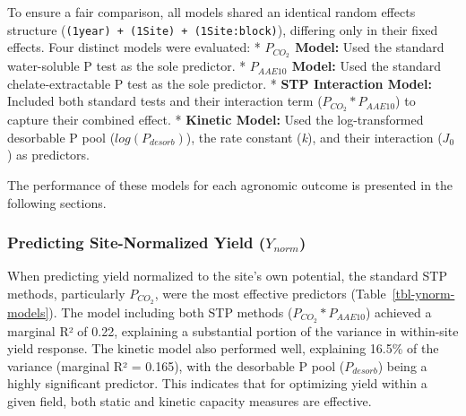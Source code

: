 \documentclass[
  a4paper,
]{article}
\begin{document}
To ensure a fair comparison, all models shared an identical random
effects structure
(\texttt{(1\textbar{}year)\ +\ (1\textbar{}Site)\ +\ (1\textbar{}Site:block)}),
differing only in their fixed effects. Four distinct models were
evaluated: * \textbf{\(P_{CO_2}\) Model:} Used the standard
water-soluble P test as the sole predictor. * \textbf{\(P_{AAE10}\)
Model:} Used the standard chelate-extractable P test as the sole
predictor. * \textbf{STP Interaction Model:} Included both standard
tests and their interaction term (\(P_{CO_2} * P_{AAE10}\)) to capture
their combined effect. * \textbf{Kinetic Model:} Used the
log-transformed desorbable P pool (\(log(P_{desorb})\)), the rate
constant (\emph{k}), and their interaction (\(J_0\)) as predictors.

The performance of these models for each agronomic outcome is presented
in the following sections.

\subsubsection{\texorpdfstring{Predicting Site-Normalized Yield
(\(Y_{norm}\))}{Predicting Site-Normalized Yield (Y\_\{norm\})}}\label{predicting-site-normalized-yield-y_norm}

When predicting yield normalized to the site's own potential, the
standard STP methods, particularly \(P_{CO_2}\), were the most effective
predictors (Table~\ref{tbl-ynorm-models}). The model including both STP
methods (\(P_{CO_2}*P_{AAE10}\)) achieved a marginal R² of 0.22,
explaining a substantial portion of the variance in within-site yield
response. The kinetic model also performed well, explaining 16.5\% of
the variance (marginal R² = 0.165), with the desorbable P pool
(\(P_{desorb}\)) being a highly significant predictor. This indicates
that for optimizing yield within a given field, both static and kinetic
capacity measures are effective.
\end{document}
